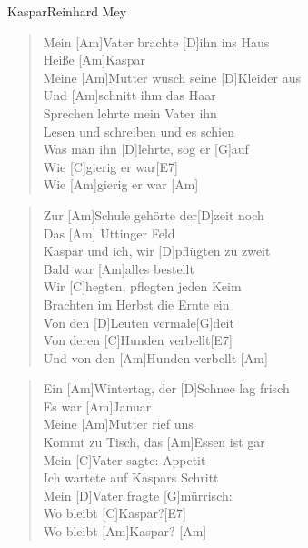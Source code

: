 \begin{song}{Kaspar}{Reinhard Mey}
    \begin{verse}  
        Mein [Am]Vater brachte [D]ihn ins Haus \\
        Heiße [Am]Kaspar \\
        Meine [Am]Mutter wusch seine [D]Kleider aus \\
        Und [Am]schnitt ihm das Haar \\
        [C]Sprechen lehrte mein Vater ihn \\
        [Am]Lesen und schreiben und es schien \\
        Was man ihn [D]lehrte, sog er [G]auf \\
        Wie [C]gierig er war[E7] \\
        Wie [Am]gierig er war \hspace{1em}[Am]
    \end{verse}  

    \begin{verse}  
        Zur [Am]Schule gehörte der[D]zeit noch \\
        Das [Am] \"Uttinger Feld \\
        [Am]Kaspar und ich, wir [D]pfl\"ugten zu zweit \\
        Bald war [Am]alles bestellt \\
        Wir [C]hegten, pflegten jeden Keim \\
        [Am]Brachten im Herbst die Ernte ein \\
        Von den [D]Leuten vermale[G]deit \\
        Von deren [C]Hunden verbellt[E7] \\
        Und von den [Am]Hunden verbellt \hspace{1em}[Am]
    \end{verse}  

    \begin{verse}
        Ein [Am]Wintertag, der [D]Schnee lag frisch \\
        Es war [Am]Januar \\
        Meine [Am]Mutter rief uns \\
        [D]Kommt zu Tisch, das [Am]Essen ist gar \\
        Mein [C]Vater sagte: Appetit \\
        [Am]Ich wartete auf Kaspars Schritt \\
        Mein [D]Vater fragte [G]m\"urrisch: \\
        Wo bleibt [C]Kaspar?[E7] \\
        Wo bleibt [Am]Kaspar? \hspace{1em}[Am]
    \end{verse}


\end{song}
